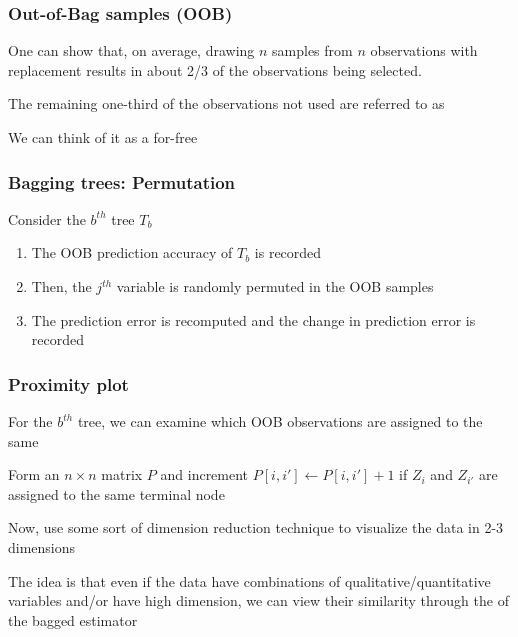 \documentclass[12pt]{beamer}
\begin{document}
\begin{frame}
\frametitle{Out-of-Bag samples (OOB)}
One can show that, on average, drawing $n$ samples from $n$ observations with replacement  results
in about 2/3 of the observations being selected.

\vsp
The remaining one-third of the observations not used are referred to as 

\vsp
We can think of it as a for-free 
\end{frame}


\begin{frame}[fragile]
\frametitle{Bagging trees: Permutation}
Consider the $b^{th}$ tree $T_b$

\begin{enumerate}
\item The OOB prediction accuracy of $T_b$ is recorded
\item Then, the $j^{th}$ variable is randomly permuted in the OOB samples
\item The prediction error is recomputed and the change in prediction error is recorded
\end{enumerate}
\end{frame}

\begin{frame}
\frametitle{Proximity plot}
For the $b^{th}$ tree, we can examine which OOB observations are assigned to the same 

\vsp
Form an $n \times n$ matrix $P$ and increment $P[i,i'] \leftarrow P[i,i'] + 1$ if $Z_{i}$ and $Z_{i'}$ are assigned to the same terminal node

\vsp
Now, use some sort of dimension reduction technique to visualize the data in 2-3 dimensions


\vsp
The idea is that even if the data have combinations of qualitative/quantitative variables and/or have high
dimension, we can view their similarity through the  of the bagged estimator
\end{frame}
\end{document}
